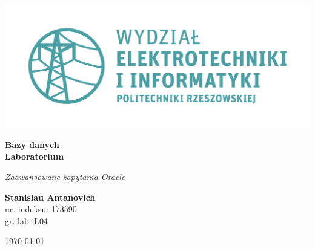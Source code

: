 \documentclass{article}
\begin{document}
\begin{titlepage}
\begin{center}
	\includegraphics[scale=0.7]{logo.png}

	\vspace*{4cm}
	\textbf{Bazy danych\\ Laboratorium}

	\vspace{1.5cm}
	\textit{Zaawansowane zapytania Oracle}

	\vspace{1.5cm}
	\textbf{Stanislau Antanovich}\\
	nr. indeksu: 173590\\
	gr. lab: L04

	\vspace{4.5cm}
	\today
\end{center}
\end{titlepage}
\end{document}

